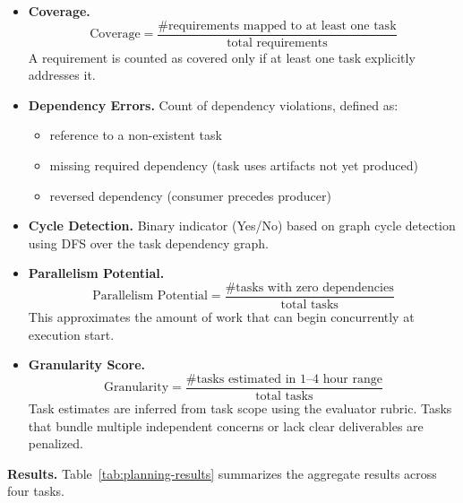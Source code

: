 \begin{itemize}
    \item \textbf{Coverage.}
    \[
    \text{Coverage} = \frac{\text{\# requirements mapped to at least one task}}{\text{total requirements}}
    \]
    A requirement is counted as covered only if at least one task explicitly addresses it.

    \item \textbf{Dependency Errors.}
    Count of dependency violations, defined as:
    \begin{itemize}
        \item reference to a non-existent task
        \item missing required dependency (task uses artifacts not yet produced)
        \item reversed dependency (consumer precedes producer)
    \end{itemize}

    \item \textbf{Cycle Detection.}
    Binary indicator (Yes/No) based on graph cycle detection using DFS over the task dependency graph.

    \item \textbf{Parallelism Potential.}
    \[
    \text{Parallelism Potential} = \frac{\text{\# tasks with zero dependencies}}{\text{total tasks}}
    \]
    This approximates the amount of work that can begin concurrently at execution start.

    \item \textbf{Granularity Score.}
    \[
    \text{Granularity} = \frac{\text{\# tasks estimated in 1--4 hour range}}{\text{total tasks}}
    \]
    Task estimates are inferred from task scope using the evaluator rubric. Tasks that bundle multiple independent concerns or lack clear deliverables are penalized.
\end{itemize}

\textbf{Results.}
Table~\ref{tab:planning-results} summarizes the aggregate results across four tasks.

\begin{table}[t]
\centering
\caption{Experiment 2 results aggregated across four tasks. Claude rows reported as mean $\pm$ sd over four planning runs per task; Qwen rows reported as single-run means (Qwen3.6-35B-A3B local llama.cpp deployment).}
\label{tab:planning-results}
\end{table}

